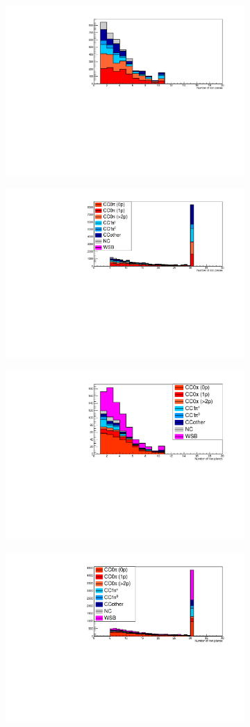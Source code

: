 \begin{figure}[tbh]
 \begin{center}
  \begin{subfigure}{0.48\textwidth}
     \includegraphics[width=0.55\linewidth, angle=270]{fig/FHCMuonPenetration_SideMRD_StoppedOrThroughGoing.pdf}
    \end{subfigure}
  \begin{subfigure}{0.48\textwidth}
    \includegraphics[width=0.55\linewidth, angle=270]{fig/FHCMuonPenetration_DownstreamMRD_StoppedOrThroughGoing.pdf}
    \end{subfigure}  
     \begin{subfigure}{0.48\textwidth}
     \includegraphics[width=0.55\linewidth, angle=270]{fig/RHCMuonPenetration_SideMRD_StoppedOrThroughGoing.pdf}
    \end{subfigure}
  \begin{subfigure}{0.48\textwidth}
    \includegraphics[width=0.55\linewidth, angle=270]{fig/RHCMuonPenetration_DownstreamMRD_StoppedOrThroughGoing.pdf}

\end{subfigure}
\end{center}
\end{figure}
